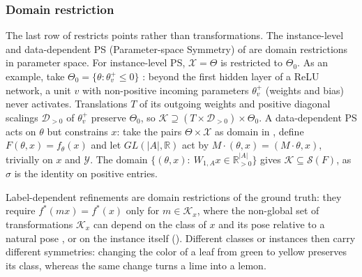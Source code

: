 \documentclass[mathematics,review,submit,moreauthors]{Definitions/mdpi}
\begin{document}
\subsubsection{Domain restriction}\label{sec:domain-restriction}
The last row of  restricts points rather than transformations.
The instance-level and data-dependent PS (Parameter-space Symmetry) of  are domain restrictions in parameter space.
For instance-level PS, $\mathcal X=\Theta$ is restricted to $\Theta_0$.
As an example, take $\Theta_0=\{\theta:\theta^+_v\le0\}$ \citep{grigsby2023p4icml}: beyond the first hidden layer of a ReLU network, a unit $v$ with non-positive incoming parameters $\theta^+_v$ (weights and bias) never activates.
Translations $T$ of its outgoing weights and positive diagonal scalings $\mathcal D_{>0}$ of $\theta^+_v$ preserve $\Theta_0$, so $\mathcal K\supseteq(T\times\mathcal D_{>0})\times\Theta_0$.
A data-dependent PS acts on $\theta$ but constrains $x$: take the pairs $\Theta\times\mathcal X$ as domain in , define $F(\theta,x)=f_\theta(x)$ and let $GL(|A|,\mathbb R)$ act by $M\cdot(\theta,x)=(M\cdot\theta,x)$, trivially on $x$ and $\mathcal Y$.
The domain $\{(\theta,x):\ W_{1,A}x\in\mathbb R^{|A|}_{>0}\}$ gives $\mathcal K\subseteq\mathcal S(F)$, as $\sigma$ is the identity on positive entries.

Label-dependent refinements are domain restrictions of the ground truth: they require $f^*(mx)=f^*(x)$ only for $m\in\mathcal K_x$, where the non-global set of transformations $\mathcal K_x$ can depend on the class of $x$ and its pose relative to a natural pose \citep{urbano2026}, or on the instance itself \citep{wang2023a,miao2023p4icml} ().
Different classes or instances then carry different symmetries: changing the color of a leaf from green to yellow preserves its class, whereas the same change turns a lime into a lemon.
\end{document}
